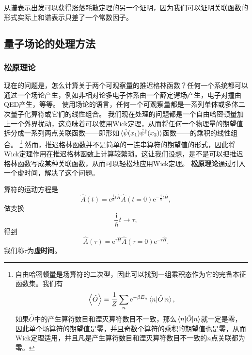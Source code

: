\documentclass[hyperref, UTF8, a4paper]{ctexart}
\newcommand*{\ii}{\mathrm{i}}
\newcommand*{\ee}{\mathrm{e}}
\begin{document}
从谱表示出发可以获得涨落耗散定理的另一个证明，因为我们可以证明关联函数的形式实际上和谱表示只差了一个常数因子。

\subsection{量子场论的处理方法}

\subsubsection{松原理论}

现在的问题是，怎么计算关于两个可观察量的推迟格林函数？任何一个系统都可以通过一个场论产生，例如非相对论多电子体系由一个薛定谔场产生，电子对撞由QED产生，等等。
使用场论的语言，任何一个可观察量都是一系列单体或多体二次量子化算符或它们的线性组合。
我们现在处理的问题都是一个自由哈密顿量加上一个外界扰动，这意味着可以使用Wick定理，从而将任何一个物理量的期望值拆分成一系列两点关联函数——即形如$\expval*{\hat{\psi}(x_1)\hat{\psi}^\dagger(x_2)}$函数——的乘积的线性组合。%
\footnote{自由哈密顿量是场算符的二次型，因此可以找到一组乘积态作为它的完备本征函数集。我们有
\[
    \expval{\hat{O}} = \frac{1}{Z} \sum_n \ee^{-\beta E_n} \mel{n}{\hat{O}}{n},
\]
如果$\hat{O}$中的产生算符数目和湮灭算符数目不一致，那么$\mel{n}{\hat{O}}{n}$就一定是零，因此单个场算符的期望值是零，并且奇数个算符的乘积的期望值也是零，从而Wick定理适用，并且凡是产生算符数目和湮灭算符数目不一致的$n$点关联都为零。
}%
然而，推迟格林函数并不是简单的一连串算符的期望值的形式，因此将Wick定理作用在推迟格林函数上计算较繁琐。这让我们设想，是不是可以把推迟格林函数写成某种关联函数，从而可以轻松地应用Wick定理。
\textbf{松原理论}通过引入一个虚时间，解决了这个问题。

算符的运动方程是
\[
    \hat{A}(t) = \ee^{\frac{\ii}{\hbar} t \hat{H}} \hat{A}(t=0) \ee^{-\frac{\ii}{\hbar} t \hat{H}},
\]
做变换
\begin{equation}
    \frac{\ii}{\hbar} t \longrightarrow \tau,
\end{equation}
得到
\begin{equation}
    \hat{A}(\tau) = \ee^{\tau \hat{H}} \hat{A}(\tau=0) \ee^{-\tau \hat{H}}.
\end{equation}
我们称$\tau$为\textbf{虚时间}。
\end{document}

